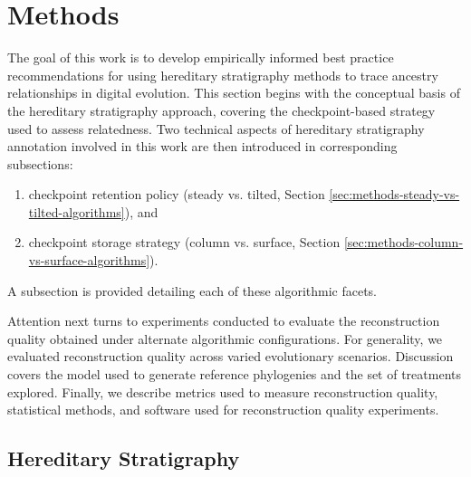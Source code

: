 \section{Methods} \label{sec:methods}

The goal of this work is to develop empirically informed best practice recommendations for using hereditary stratigraphy methods to trace ancestry relationships in digital evolution.
This section begins with the conceptual basis of the hereditary stratigraphy approach, covering the checkpoint-based strategy used to assess relatedness.
Two technical aspects of hereditary stratigraphy annotation involved in this work are then introduced in corresponding subsections:
\begin{enumerate}
\item checkpoint retention policy (steady vs. tilted, Section \ref{sec:methods-steady-vs-tilted-algorithms}), and
\item checkpoint storage strategy (column vs. surface, Section \ref{sec:methods-column-vs-surface-algorithms}).
\end{enumerate}
A subsection is provided detailing each of these algorithmic facets.

Attention next turns to experiments conducted to evaluate the reconstruction quality obtained under alternate algorithmic configurations.
For generality, we evaluated reconstruction quality across varied evolutionary scenarios.
Discussion covers the model used to generate reference phylogenies and the set of treatments explored.
Finally, we describe metrics used to measure reconstruction quality, statistical methods, and software used for reconstruction quality experiments.

\subsection{Hereditary Stratigraphy}


